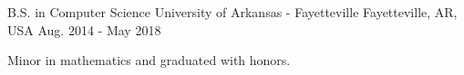 

\begin{cventries}

  \cventry
    {B.S. in Computer Science} %
    {University of Arkansas - Fayetteville} %
    {Fayetteville, AR, USA} %
    {Aug. 2014 - May 2018} %
    {
      \begin{cvitems} %
        \item {Minor in mathematics and graduated with honors.}
      \end{cvitems}
    }

\end{cventries}
